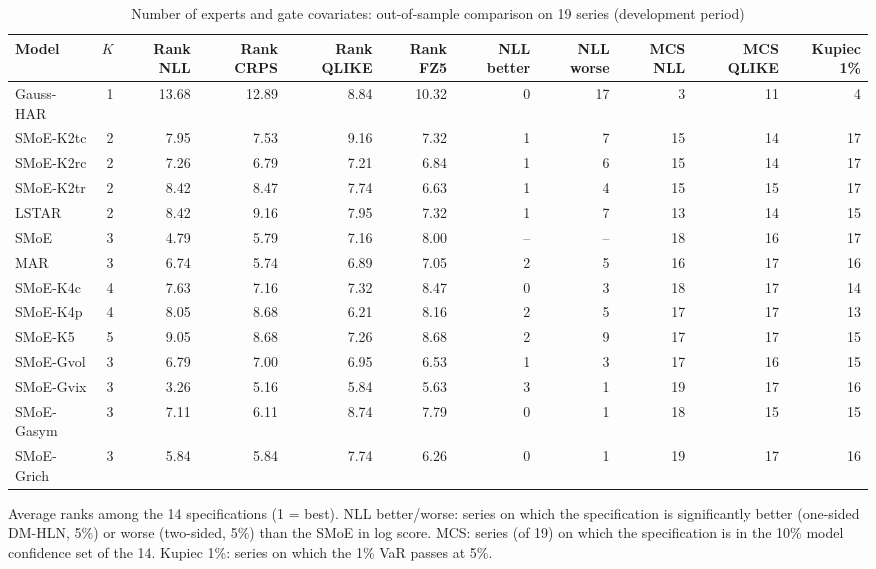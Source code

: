 \begin{table}[!htbp]\centering\footnotesize
\caption{Number of experts and gate covariates: out-of-sample comparison on 19 series (development period)}\label{tab:kg-oos}
\begin{adjustbox}{max width=\textwidth}
\begin{tabular}{lrrrrrrrrrr}
\toprule
Model & $K$ & Rank NLL & Rank CRPS & Rank QLIKE & Rank FZ5 & NLL better & NLL worse & MCS NLL & MCS QLIKE & Kupiec 1\%\\
\midrule
Gauss-HAR & 1 & 13.68 & 12.89 & 8.84 & 10.32 & 0 & 17 & 3 & 11 & 4\\
SMoE-K2tc & 2 & 7.95 & 7.53 & 9.16 & 7.32 & 1 & 7 & 15 & 14 & 17\\
SMoE-K2rc & 2 & 7.26 & 6.79 & 7.21 & 6.84 & 1 & 6 & 15 & 14 & 17\\
SMoE-K2tr & 2 & 8.42 & 8.47 & 7.74 & 6.63 & 1 & 4 & 15 & 15 & 17\\
LSTAR & 2 & 8.42 & 9.16 & 7.95 & 7.32 & 1 & 7 & 13 & 14 & 15\\
SMoE & 3 & 4.79 & 5.79 & 7.16 & 8.00 & -- & -- & 18 & 16 & 17\\
MAR & 3 & 6.74 & 5.74 & 6.89 & 7.05 & 2 & 5 & 16 & 17 & 16\\
SMoE-K4c & 4 & 7.63 & 7.16 & 7.32 & 8.47 & 0 & 3 & 18 & 17 & 14\\
SMoE-K4p & 4 & 8.05 & 8.68 & 6.21 & 8.16 & 2 & 5 & 17 & 17 & 13\\
SMoE-K5 & 5 & 9.05 & 8.68 & 7.26 & 8.68 & 2 & 9 & 17 & 17 & 15\\
SMoE-Gvol & 3 & 6.79 & 7.00 & 6.95 & 6.53 & 1 & 3 & 17 & 16 & 15\\
SMoE-Gvix & 3 & 3.26 & 5.16 & 5.84 & 5.63 & 3 & 1 & 19 & 17 & 16\\
SMoE-Gasym & 3 & 7.11 & 6.11 & 8.74 & 7.79 & 0 & 1 & 18 & 15 & 15\\
SMoE-Grich & 3 & 5.84 & 5.84 & 7.74 & 6.26 & 0 & 1 & 19 & 17 & 16\\
\bottomrule
\end{tabular}
\end{adjustbox}
\par\smallskip\begin{minipage}{\textwidth}\footnotesize
Average ranks among the 14 specifications (1 = best). NLL better/worse: series on which the specification is significantly better (one-sided DM-HLN, 5\%) or worse (two-sided, 5\%) than the SMoE in log score. MCS: series (of 19) on which the specification is in the 10\% model confidence set of the 14. Kupiec 1\%: series on which the 1\% VaR passes at 5\%.
\end{minipage}
\end{table}